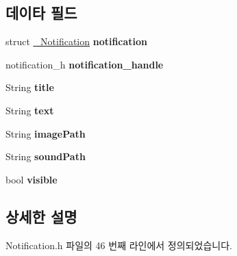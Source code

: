 \subsection*{데이타 필드}
\begin{DoxyCompactItemize}
\item 
\hypertarget{struct_notification_extend_a7e3b5846fc96caa1bf325b063f5b56ec}{struct \hyperlink{struct___notification}{\-\_\-\-Notification} {\bfseries notification}}\label{struct_notification_extend_a7e3b5846fc96caa1bf325b063f5b56ec}

\item 
\hypertarget{struct_notification_extend_a1c5a3131495086704fd49c62b63f95d6}{notification\-\_\-h {\bfseries notification\-\_\-handle}}\label{struct_notification_extend_a1c5a3131495086704fd49c62b63f95d6}

\item 
\hypertarget{struct_notification_extend_a499aeec850a240ae1aecd939c5043590}{String {\bfseries title}}\label{struct_notification_extend_a499aeec850a240ae1aecd939c5043590}

\item 
\hypertarget{struct_notification_extend_a685ed5195435d2b3e75433f46aec6e1e}{String {\bfseries text}}\label{struct_notification_extend_a685ed5195435d2b3e75433f46aec6e1e}

\item 
\hypertarget{struct_notification_extend_a7480fd65ec0c3010b75b111ed2611adb}{String {\bfseries image\-Path}}\label{struct_notification_extend_a7480fd65ec0c3010b75b111ed2611adb}

\item 
\hypertarget{struct_notification_extend_ac2d6721b778cd06197fc40a5595c54e1}{String {\bfseries sound\-Path}}\label{struct_notification_extend_ac2d6721b778cd06197fc40a5595c54e1}

\item 
\hypertarget{struct_notification_extend_aa54a57ae048476d840caf6d4d2c47aa3}{bool {\bfseries visible}}\label{struct_notification_extend_aa54a57ae048476d840caf6d4d2c47aa3}

\end{DoxyCompactItemize}


\subsection{상세한 설명}


Notification.\-h 파일의 46 번째 라인에서 정의되었습니다.



